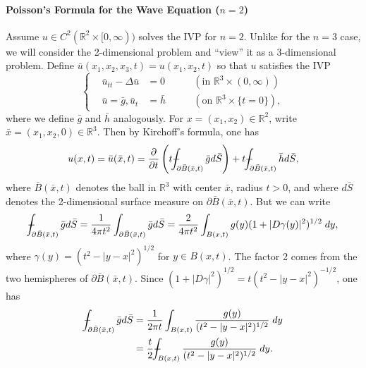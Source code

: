 \documentclass{article}
\def\Xint#1{\mathchoice
	{\XXint\displaystyle\textstyle{#1}}%
	{\XXint\textstyle\scriptstyle{#1}}%
	{\XXint\scriptstyle\scriptscriptstyle{#1}}%
	{\XXint\scriptscriptstyle\scriptscriptstyle{#1}}%
	\!\int}
\def\XXint#1#2#3{{\setbox0=\hbox{$#1{#2#3}{\int}$ }
		\vcenter{\hbox{$#2#3$ }}\kern-0.6\wd0}}
\def\dashint{\Xint-}
\begin{document}
\paragraph{Poisson's Formula for the Wave Equation \texorpdfstring{($n = 2$)}{n=2}} Assume $u \in C^{2}(\mathbb{R}^{2} \times [0,\infty))$ solves the IVP for $n = 2$. Unlike for the $n = 3$ case, we will consider the 2-dimensional problem and ``view'' it as a 3-dimensional problem. Define $\bar{u}(x_{1}, x_{2}, x_{3}, t) = u(x_{1}, x_{2}, t)$ so that $u$ satisfies the IVP 
\begin{equation*}
	\left\{
	\begin{alignedat}{3}
		&\bar{u}_{tt} - \Delta \bar{u} &= 0 &\qquad(\text{in $\mathbb{R}^{3} \times (0, \infty)$}) \\
		&\bar{u} =\bar{g}, \bar{u}_{t} &= \bar{h} &\qquad(\text{on $\mathbb{R}^{3} \times \{t = 0\}$}), 
	\end{alignedat}
	\right.
\end{equation*}
where we define $\bar{g}$ and $\bar{h}$ analogously. For $x = (x_{1}, x_{2}) \in \mathbb{R}^{2}$, write $\bar{x} = (x_{1}, x_{2}, 0) \in \mathbb{R}^{3}$. Then by Kirchoff's formula, one has 
\begin{equation*}
	u(x, t) = \bar{u}(\bar{x}, t) = \frac{\partial}{\partial t}\left(t\dashint_{\partial \bar{B}(\bar{x},t)}\bar{g}d\bar{S}\right) + t\dashint_{\partial \bar{B}(\bar{x},t)}\bar{h}d\bar{S}, 
\end{equation*}
where $\bar{B}(\bar{x}, t)$ denotes the ball in $\mathbb{R}^{3}$ with center $\bar{x}$, radius $t > 0$, and where $d\bar{S}$ denotes the 2-dimensional surface measure on $\partial \bar{B}(\bar{x}, t)$. But we can write 
\begin{equation*}
	\dashint_{\partial \bar{B}(\bar{x},t)}\bar{g}d\bar{S} = \frac{1}{4\pi t^{2}}\int_{\partial \bar{B}(\bar{x}, t)}\bar{g}d\bar{S} = \frac{2}{4\pi t^{2}}\int_{B(x,t)}g(y)(1 + |D\gamma(y)|^{2})^{1/2}\;dy, 
\end{equation*}
where $\gamma(y) = (t^{2} - |y - x|^{2})^{1/2}$ for $y \in B(x, t)$. The factor 2 comes from the two hemispheres of $\partial\bar{B}(\bar{x}, t)$. Since $(1 + |D\gamma|^{2})^{1/2} = t(t^{2} - |y - x|^{2})^{-1/2}$, one has 
\begin{align*}
	\begin{split}
		\dashint_{\partial \bar{B}(\bar{x}, t)}\bar{g}d\bar{S} &= \frac{1}{2\pi t}\int_{B(x,t)}\frac{g(y)}{(t^{2} - |y - x|^{2})^{1/2}}\;dy \\
		&= \frac{t}{2}\dashint_{B(x,t)}\frac{g(y)}{(t^{2} - |y - x|^{2})^{1/2}}\;dy.
	\end{split}
\end{align*}
\end{document}
